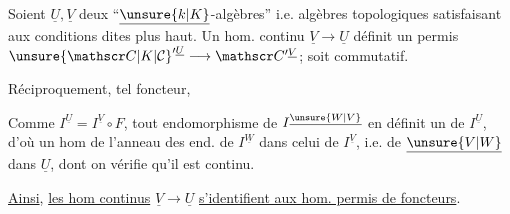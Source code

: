 Soient $\underline U,\underline V$ deux  ``$\underline{\unsure{k|K}}$-algèbres'' i.e.
algèbres topologiques  satisfaisant aux
conditions dites plus haut. Un hom. continu
 $\underline V\longrightarrow\underline U$
définit un  permis $\unsure{\mathscr C|K|\mathcal C}'^{\underline U}\longrightarrow\mathscr C'^{\underline V}$;
soit commutatif.

Réciproquement,  tel foncteur, 

Comme $I^{\underline U}=I^{\underline V}\circ F$, tout endomorphisme
de $I^{\underline{\unsure{W|V}}}$ en définit un de $I^{\underline U}$, d'où
un hom de l'anneau des end.
de $I^{\underline W}$ dans celui de $I^{\underline V}$, i.e. de $\underline{\unsure{V|W}}$ dans
$\underline U$, dont on vérifie qu'il est continu.

\uline{Ainsi}, \uline{les hom continus} $\underline V\longrightarrow\underline U$
\uline{s'identifient aux hom. permis de foncteurs}.

